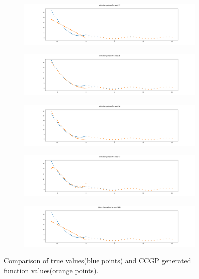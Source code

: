 \documentclass{article}
\begin{document}
\begin{figure}[h!]
	\centering
	\begin{subfigure}[b]{\linewidth}
		\includegraphics[width=\linewidth]{ccgp_chart_17.png}
	\end{subfigure}
\begin{subfigure}[b]{\linewidth}
	\includegraphics[width=\linewidth]{ccgp_chart_35.png}
\end{subfigure}
\begin{subfigure}[b]{\linewidth}
	\includegraphics[width=\linewidth]{ccgp_chart_36.png}
\end{subfigure}
\begin{subfigure}[b]{\linewidth}
	\includegraphics[width=\linewidth]{ccgp_chart_47.png}
\end{subfigure}
\begin{subfigure}[b]{\linewidth}
	\includegraphics[width=\linewidth]{ccgp_chart_162.png}
\end{subfigure}
	\caption{Comparison of true values(blue points) and CCGP generated function values(orange points).}
\end{figure}
\end{document}
